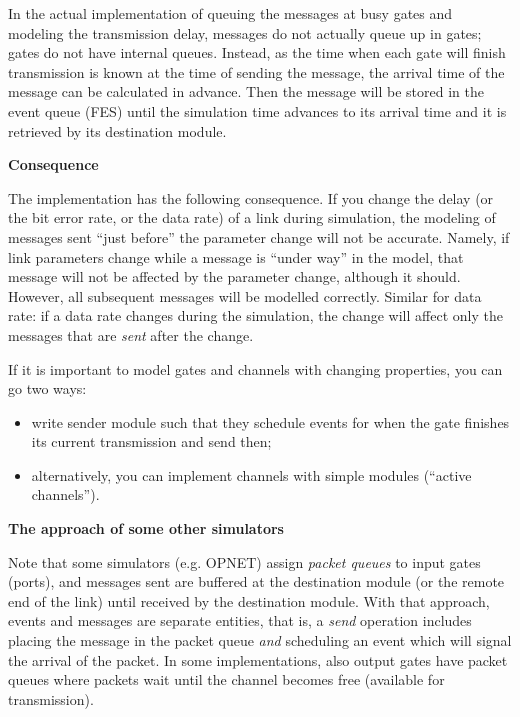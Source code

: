 In the actual implementation of queuing the messages at busy gates and
modeling the transmission delay, messages do not actually queue up in
gates; gates do not have internal queues. Instead, as the time when
each gate will finish transmission is known at the time of sending the
message, the arrival time of the message can be
calculated in advance. Then the message will be stored in the event
queue (FES) until the simulation time advances to its
arrival time and it is retrieved by its destination module.

%
%


\textbf{Consequence}


The implementation has the following consequence. If you change the
delay (or the bit error rate, or the data rate) of a link during simulation, the modeling of messages sent ``just
before'' the parameter change will not be accurate. Namely, if link
parameters change while a message is ``under way'' in the model, that
message will not be affected by the parameter change, although it
should. However, all subsequent messages will be modelled correctly.
Similar for data rate: if a data rate changes during the simulation,
the change will affect only the messages that are \textit{sent} after
the change.

If it is important to model gates and channels with changing
properties, you can go two ways:
\begin{itemize}
  \item{write sender module such that they schedule events for when the
    gate finishes its current transmission and send then;}
  \item{alternatively, you can implement channels with
    simple modules (``active channels'').}
\end{itemize}

\textbf{The approach of some other simulators}


Note that some simulators (e.g. OPNET) assign \textit{packet queues}
to input gates (ports), and messages sent are buffered at the
destination module (or the remote end of the link) until received by
the destination module. With that approach, events and messages are
separate entities, that is, a \textit{send} operation includes placing
the message in the packet queue \textit{and} scheduling an event which
will signal the arrival of the packet. In some implementations, also
output gates have packet queues where packets wait until the channel
becomes free (available for transmission).

